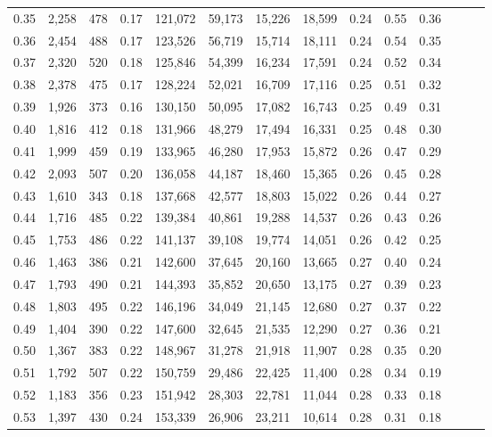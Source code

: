 \begin{tabular}{rrrrrrrrrrrrrr}
0.35 &  2,258 &  478 &  0.17 &  121,072 &   59,173 &  15,226 &  18,599 &  0.24 &  0.55 &      0.36 \\
0.36 &  2,454 &  488 &  0.17 &  123,526 &   56,719 &  15,714 &  18,111 &  0.24 &  0.54 &      0.35 \\
0.37 &  2,320 &  520 &  0.18 &  125,846 &   54,399 &  16,234 &  17,591 &  0.24 &  0.52 &      0.34 \\
0.38 &  2,378 &  475 &  0.17 &  128,224 &   52,021 &  16,709 &  17,116 &  0.25 &  0.51 &      0.32 \\
0.39 &  1,926 &  373 &  0.16 &  130,150 &   50,095 &  17,082 &  16,743 &  0.25 &  0.49 &      0.31 \\
0.40 &  1,816 &  412 &  0.18 &  131,966 &   48,279 &  17,494 &  16,331 &  0.25 &  0.48 &      0.30 \\
0.41 &  1,999 &  459 &  0.19 &  133,965 &   46,280 &  17,953 &  15,872 &  0.26 &  0.47 &      0.29 \\
0.42 &  2,093 &  507 &  0.20 &  136,058 &   44,187 &  18,460 &  15,365 &  0.26 &  0.45 &      0.28 \\
0.43 &  1,610 &  343 &  0.18 &  137,668 &   42,577 &  18,803 &  15,022 &  0.26 &  0.44 &      0.27 \\
0.44 &  1,716 &  485 &  0.22 &  139,384 &   40,861 &  19,288 &  14,537 &  0.26 &  0.43 &      0.26 \\
0.45 &  1,753 &  486 &  0.22 &  141,137 &   39,108 &  19,774 &  14,051 &  0.26 &  0.42 &      0.25 \\
0.46 &  1,463 &  386 &  0.21 &  142,600 &   37,645 &  20,160 &  13,665 &  0.27 &  0.40 &      0.24 \\
0.47 &  1,793 &  490 &  0.21 &  144,393 &   35,852 &  20,650 &  13,175 &  0.27 &  0.39 &      0.23 \\
0.48 &  1,803 &  495 &  0.22 &  146,196 &   34,049 &  21,145 &  12,680 &  0.27 &  0.37 &      0.22 \\
0.49 &  1,404 &  390 &  0.22 &  147,600 &   32,645 &  21,535 &  12,290 &  0.27 &  0.36 &      0.21 \\
0.50 &  1,367 &  383 &  0.22 &  148,967 &   31,278 &  21,918 &  11,907 &  0.28 &  0.35 &      0.20 \\
0.51 &  1,792 &  507 &  0.22 &  150,759 &   29,486 &  22,425 &  11,400 &  0.28 &  0.34 &      0.19 \\
0.52 &  1,183 &  356 &  0.23 &  151,942 &   28,303 &  22,781 &  11,044 &  0.28 &  0.33 &      0.18 \\
0.53 &  1,397 &  430 &  0.24 &  153,339 &   26,906 &  23,211 &  10,614 &  0.28 &  0.31 &      0.18 \\

\end{tabular}
